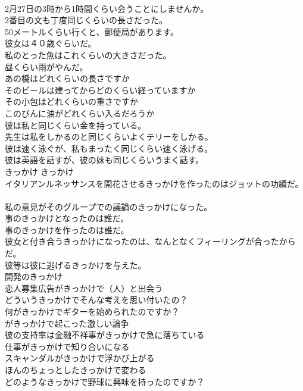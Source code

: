 \documentclass[8pt]{extreport}
\begin{document}
\begin{CJK}{UTF8}{min}
\\	2月27日の3時から1時間くらい会うことにしませんか。  
\\	2番目の文も丁度同じくらいの長さだった。  
\\	50メートルくらい行くと、郵便局があります。  
\\	彼女は４０歳ぐらいだ。   
\\	私のとった魚はこれくらいの大きさだった。   
\\	昼くらい雨がやんだ。   
\\	あの橋はどれくらいの長さですか   
\\	そのビールは建ってからどのくらい経っていますか   
\\	その小包はどれくらいの重さですか   
\\	このびんに油がどれくらい入るだろうか   
\\	彼は私と同じくらい金を持っている。   
\\	先生は私をしかるのと同じくらいよくテリーをしかる。   
\\	彼は速く泳ぐが、私もまったく同じくらい速く泳げる。   
\\	彼は英語を話すが、彼の妹も同じくらいうまく話す。   
\\	きっかけ	きっかけ	
\\	イタリアンルネッサンスを開花させるきっかけを作ったのはジョットの功績だ。   
\\	私の意見がそのグループでの議論のきっかけになった。   
\\	事のきっかけとなったのは誰だ。   
\\	事のきっかけを作ったのは誰だ。   
\\	彼女と付き合うきっかけになったのは、なんとなくフィーリングが合ったからだ。   
\\	彼等は彼に逃げるきっかけを与えた。   
\\	開発のきっかけ   
\\	恋人募集広告がきっかけで（人）と出会う   
\\	どういうきっかけでそんな考えを思い付いたの？   
\\	何がきっかけでギターを始められたのですか？   
\\	がきっかけで起こった激しい論争   
\\	彼の支持率は金融不祥事がきっかけで急に落ちている   
\\	仕事がきっかけで知り合いになる   
\\	スキャンダルがきっかけで浮かび上がる   
\\	ほんのちょっとしたきっかけで変わる   
\\	どのようなきっかけで野球に興味を持ったのですか？   

\end{CJK}
\end{document}
